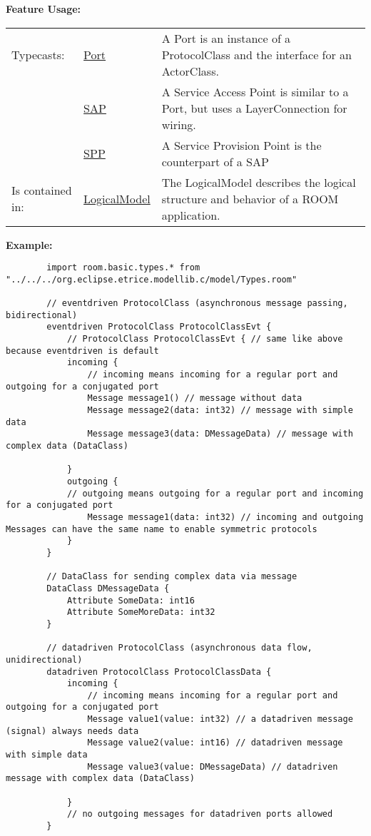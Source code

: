 	\begingroup
	\textbf{Feature Usage:}
	\renewcommand{\arraystretch}{1.8} %
	\begin{longtable}{l|l p{}}
		\hline
	Typecasts: & \tabitem \hyperlink{ref:Port}{Port}  & A Port is an instance of a ProtocolClass and the interface for an ActorClass.\\
	& \tabitem \hyperlink{ref:SAP}{SAP}  & A Service Access Point is similar to a Port, but uses a LayerConnection for wiring. \\
	& \tabitem \hyperlink{ref:SPP}{SPP}  & A Service Provision Point is the counterpart of a SAP \\
	\hline
	Is contained in: & \tabitem \hyperlink{ref:LogicalModel}{LogicalModel}  & The LogicalModel describes the logical structure and behavior of a ROOM application.\\
	\hline
	\end{longtable}
	\endgroup
		
	\textbf{Example:}
	
		\begin{lstlisting}
		import room.basic.types.* from "../../../org.eclipse.etrice.modellib.c/model/Types.room"
		
		// eventdriven ProtocolClass (asynchronous message passing, bidirectional)
		eventdriven ProtocolClass ProtocolClassEvt {
			// ProtocolClass ProtocolClassEvt { // same like above because eventdriven is default 
			incoming {
				// incoming means incoming for a regular port and outgoing for a conjugated port
				Message message1() // message without data
				Message message2(data: int32) // message with simple data
				Message message3(data: DMessageData) // message with complex data (DataClass)
		
			}
			outgoing {
			// outgoing means outgoing for a regular port and incoming for a conjugated port
				Message message1(data: int32) // incoming and outgoing Messages can have the same name to enable symmetric protocols
			}
		}
		
		// DataClass for sending complex data via message
		DataClass DMessageData {
			Attribute SomeData: int16
			Attribute SomeMoreData: int32
		}
		
		// datadriven ProtocolClass (asynchronous data flow, unidirectional)
		datadriven ProtocolClass ProtocolClassData {
			incoming {
				// incoming means incoming for a regular port and outgoing for a conjugated port
				Message value1(value: int32) // a datadriven message (signal) always needs data
				Message value2(value: int16) // datadriven message with simple data
				Message value3(value: DMessageData) // datadriven message with complex data (DataClass)
		
			}
			// no outgoing messages for datadriven ports allowed 
		}
		\end{lstlisting}
	
